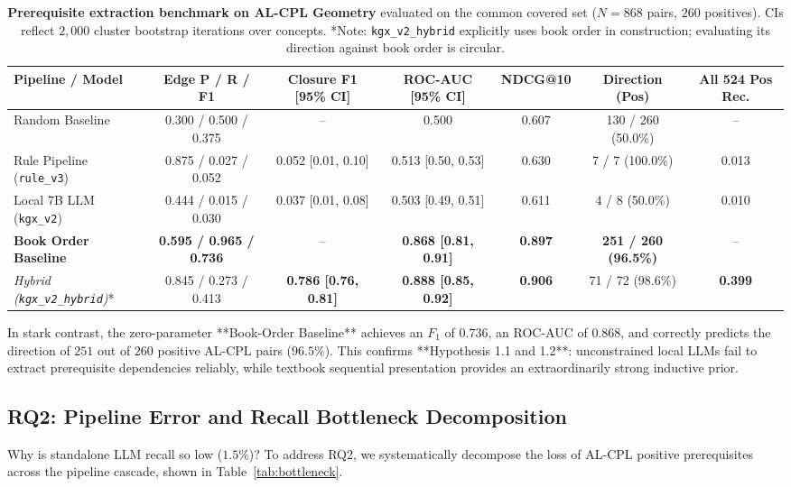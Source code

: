 \documentclass[11pt,a4paper]{article}
\begin{document}
\begin{table}[t]
\centering
\small
\begin{tabular}{lcccccc}
\toprule
\textbf{Pipeline / Model} & \textbf{Edge P / R / F1} & \textbf{Closure F1 [95\% CI]} & \textbf{ROC-AUC [95\% CI]} & \textbf{NDCG@10} & \textbf{Direction (Pos)} & \textbf{All 524 Pos Rec.} \\
\midrule
Random Baseline & 0.300 / 0.500 / 0.375 & -- & 0.500 & 0.607 & 130 / 260 (50.0\%) & -- \\
Rule Pipeline (\texttt{rule\_v3}) & 0.875 / 0.027 / 0.052 & 0.052 [0.01, 0.10] & 0.513 [0.50, 0.53] & 0.630 & 7 / 7 (100.0\%) & 0.013 \\
Local 7B LLM (\texttt{kgx\_v2}) & 0.444 / 0.015 / 0.030 & 0.037 [0.01, 0.08] & 0.503 [0.49, 0.51] & 0.611 & 4 / 8 (50.0\%) & 0.010 \\
\textbf{Book Order Baseline} & \textbf{0.595 / 0.965 / 0.736} & -- & \textbf{0.868 [0.81, 0.91]} & \textbf{0.897} & \textbf{251 / 260 (96.5\%)} & -- \\
\midrule
\textit{Hybrid (\texttt{kgx\_v2\_hybrid})}* & 0.845 / 0.273 / 0.413 & \textbf{0.786 [0.76, 0.81]} & \textbf{0.888 [0.85, 0.92]} & \textbf{0.906} & 71 / 72 (98.6\%) & \textbf{0.399} \\
\bottomrule
\end{tabular}
\caption{\textbf{Prerequisite extraction benchmark on AL-CPL Geometry} evaluated on the common covered set ($N=868$ pairs, $260$ positives). CIs reflect $2,000$ cluster bootstrap iterations over concepts. *Note: \texttt{kgx\_v2\_hybrid} explicitly uses book order in construction; evaluating its direction against book order is circular.}
\label{tab:main_prereq}
\end{table}

In stark contrast, the zero-parameter **Book-Order Baseline** achieves an $F_1$ of $0.736$, an ROC-AUC of $0.868$, and correctly predicts the direction of $251$ out of $260$ positive AL-CPL pairs ($96.5\%$). This confirms **Hypothesis 1.1 and 1.2**: unconstrained local LLMs fail to extract prerequisite dependencies reliably, while textbook sequential presentation provides an extraordinarily strong inductive prior.

\subsection{RQ2: Pipeline Error and Recall Bottleneck Decomposition}

Why is standalone LLM recall so low ($1.5\%$)? To address RQ2, we systematically decompose the loss of AL-CPL positive prerequisites across the pipeline cascade, shown in Table~\ref{tab:bottleneck}.
\end{document}

